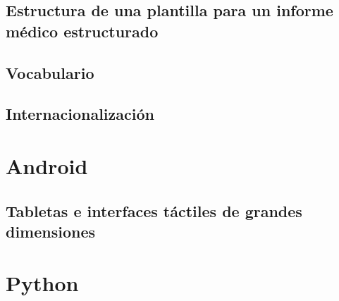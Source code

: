 \subsection{Estructura de una plantilla para un informe médico estructurado}\label{dicomsr:plantillas}
\subsection{Vocabulario}\label{dicomsr:vocabulario}
\subsection{Internacionalización}\label{dicomsr:internacionalizacion}

\section{Android}
\subsection{Tabletas e interfaces táctiles de grandes dimensiones}
\section{Python}